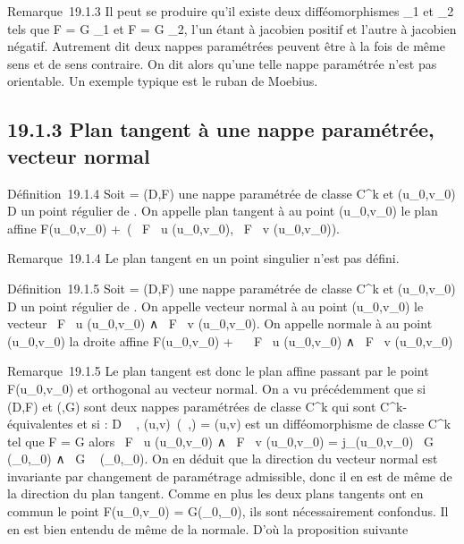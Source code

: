 \documentclass[]{article}
\begin{document}
Remarque~19.1.3 Il peut se produire qu'il existe deux difféomorphismes
\theta_1 et \theta_2 tels que F = G \cdot \theta_1 et F = G \cdot
\theta_2, l'un étant à jacobien positif et l'autre à jacobien
négatif. Autrement dit deux nappes paramétrées peuvent être à la fois de
même sens et de sens contraire. On dit alors qu'une telle nappe
paramétrée n'est pas orientable. Un exemple typique est le ruban de
Moebius.

\subsection{19.1.3 Plan tangent à une nappe paramétrée, vecteur normal}

Définition~19.1.4 Soit \Gamma = (D,F) une nappe paramétrée de classe
C^k et (u_0,v_0) \in D un point régulier de
\Sigma. On appelle plan tangent à \Sigma au point (u_0,v_0) le
plan affine F(u_0,v_0) +\
\mathrmVect( \partial~F \over \partial~u
(u_0,v_0), \partial~F \over \partial~v
(u_0,v_0)).

Remarque~19.1.4 Le plan tangent en un point singulier n'est pas défini.

Définition~19.1.5 Soit \Sigma = (D,F) une nappe paramétrée de classe
C^k et (u_0,v_0) \in D un point régulier de
\Sigma. On appelle vecteur normal à \Sigma au point (u_0,v_0) le
vecteur  \partial~F \over \partial~u (u_0,v_0) ∧
\partial~F \over \partial~v (u_0,v_0). On appelle
normale à \Sigma au point (u_0,v_0) la droite affine
F(u_0,v_0) + ~ \partial~F \over \partial~u
(u_0,v_0) ∧ \partial~F \over \partial~v
(u_0,v_0)

Remarque~19.1.5 Le plan tangent est donc le plan affine passant par le
point F(u_0,v_0) et orthogonal au vecteur normal. On a
vu précédemment que si (D,F) et (\Delta,G) sont deux nappes paramétrées de
classe C^k qui sont C^k-équivalentes et si \theta : D \rightarrow~
\Delta, (u,v)\mapsto~(\lambda~,\mu) = \theta(u,v) est un
difféomorphisme de classe C^k tel que F = G \cdot \theta alors  \partial~F
\over \partial~u (u_0,v_0) ∧ \partial~F
\over \partial~v (u_0,v_0) =
j_\theta(u_0,v_0) \partial~G \over \partial~\lambda~
(\lambda_0,\mu_0) ∧ \partial~G \over \partial~\mu
(\lambda_0,\mu_0). On en déduit que la direction du vecteur
normal est invariante par changement de paramétrage admissible, donc il
en est de même de la direction du plan tangent. Comme en plus les deux
plans tangents ont en commun le point F(u_0,v_0) =
G(\lambda_0,\mu_0), ils sont nécessairement confondus. Il en
est bien entendu de même de la normale. D'où la proposition suivante
\end{document}
